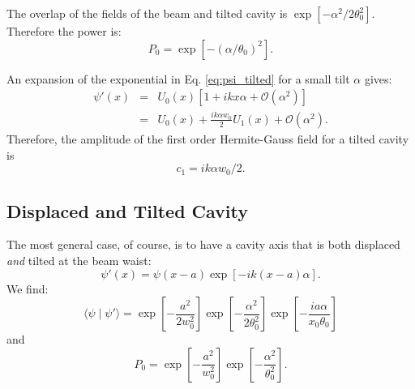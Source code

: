 The overlap of the fields of the beam and tilted cavity is $ \exp{[-\alpha^2/2 \theta_0^2]} $. Therefore the power is:
\begin{equation}
P_0 = \exp{[-(\alpha/\theta_0)^2]}.
\end{equation}

An expansion of the exponential in Eq. \ref{eq:psi_tilted} for a small
tilt $\alpha$ gives:
\begin{eqnarray}
\psi \prime(x) &=& U_0(x) [1 + i k x \alpha + \mathcal{O}(\alpha^2) ] \\
&=& U_0(x) + \frac{i k \alpha w_0}{2} U_1(x) + \mathcal{O}(\alpha^2).
\end{eqnarray}
Therefore, the amplitude of the first order Hermite-Gauss field for a
tilted cavity is 
\begin{equation}
c_1 = i k \alpha w_0 / 2.
\end{equation}


\subsection{Displaced and Tilted Cavity}
The most general case, of course, is to have a cavity axis that is both displaced \emph{and} tilted at the beam waist:
\begin{equation}
\psi \prime(x) = \psi(x-a) \exp{[-i k (x-a) \alpha]}.
\end{equation}
We find:
\begin{equation}
\langle \psi \mid \psi \prime \rangle = \exp{\left[- \frac{a^2}{2 w_0^2} \right]} \exp{\left[-\frac{\alpha^2}{2 \theta_0^2}\right]} \exp{\left[- \frac{i a \alpha}{x_0 \theta_0}\right]}
\end{equation}
and
\begin{equation}
P_0 = \exp{\left[- \frac{a^2}{w_0^2} \right]}
\exp{\left[-\frac{\alpha^2}{\theta_0^2}\right]}.
\label{eq:pwr_disptilt}
\end{equation}



